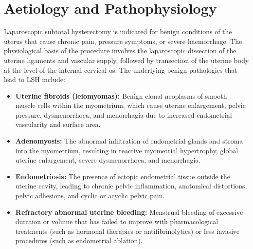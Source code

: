 \section*{Aetiology and Pathophysiology}
Laparoscopic subtotal hysterectomy is indicated for benign conditions of the uterus that cause chronic pain, pressure symptoms, or severe haemorrhage. The physiological basis of the procedure involves the laparoscopic dissection of the uterine ligaments and vascular supply, followed by transection of the uterine body at the level of the internal cervical os. The underlying benign pathologies that lead to LSH include:
\begin{itemize}
    \item \textbf{Uterine fibroids (leiomyomas):} Benign clonal neoplasms of smooth muscle cells within the myometrium, which cause uterine enlargement, pelvic pressure, dysmenorrhoea, and menorrhagia due to increased endometrial vascularity and surface area.
    \item \textbf{Adenomyosis:} The abnormal infiltration of endometrial glands and stroma into the myometrium, resulting in reactive myometrial hypertrophy, global uterine enlargement, severe dysmenorrhoea, and menorrhagia.
    \item \textbf{Endometriosis:} The presence of ectopic endometrial tissue outside the uterine cavity, leading to chronic pelvic inflammation, anatomical distortions, pelvic adhesions, and cyclic or acyclic pelvic pain.
    \item \textbf{Refractory abnormal uterine bleeding:} Menstrual bleeding of excessive duration or volume that has failed to improve with pharmacological treatments (such as hormonal therapies or antifibrinolytics) or less invasive procedures (such as endometrial ablation).
\end{itemize}

